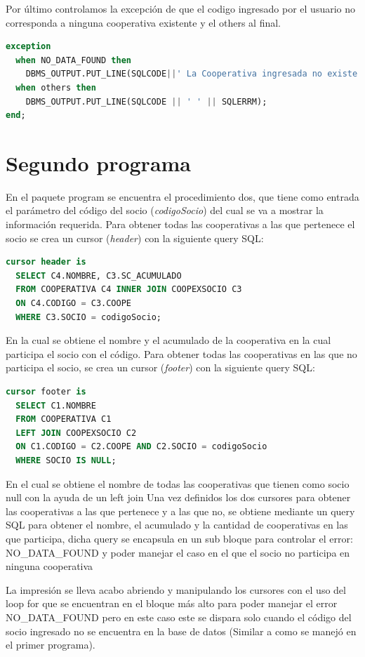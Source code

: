 \documentclass{article}
\begin{document}
Por último controlamos la excepción de que el codigo ingresado por el usuario no corresponda a ninguna cooperativa existente y el others al final.

\begin{lstlisting}[language=SQL,label={lst:lstlisting13}]
exception
  when NO_DATA_FOUND then
    DBMS_OUTPUT.PUT_LINE(SQLCODE||' La Cooperativa ingresada no existe');
  when others then
    DBMS_OUTPUT.PUT_LINE(SQLCODE || ' ' || SQLERRM);
end;
\end{lstlisting}

\section{Segundo programa}
En el paquete program se encuentra el procedimiento dos, que tiene como entrada el parámetro del código del socio (\emph{codigoSocio}) del cual se va a mostrar la información requerida.
Para obtener todas las cooperativas a las que pertenece el socio se crea un cursor (\emph{header}) con la siguiente query SQL: 

\begin{lstlisting}[language=SQL,label={lst:lstlisting14}]
cursor header is
  SELECT C4.NOMBRE, C3.SC_ACUMULADO
  FROM COOPERATIVA C4 INNER JOIN COOPEXSOCIO C3 
  ON C4.CODIGO = C3.COOPE
  WHERE C3.SOCIO = codigoSocio;
\end{lstlisting}
En la cual se obtiene el nombre y el acumulado de la cooperativa en la cual participa el socio con el código.
Para obtener todas las cooperativas en las que no participa el socio, se crea un cursor (\emph{footer}) con la siguiente query SQL: 
\begin{lstlisting}[language=SQL,label={lst:lstlisting15}]
cursor footer is
  SELECT C1.NOMBRE
  FROM COOPERATIVA C1
  LEFT JOIN COOPEXSOCIO C2
  ON C1.CODIGO = C2.COOPE AND C2.SOCIO = codigoSocio
  WHERE SOCIO IS NULL;
\end{lstlisting}
En el cual se obtiene el nombre de todas las cooperativas que tienen como socio null con la ayuda de un left join
Una vez definidos los dos cursores para obtener las cooperativas a las que pertenece y a las que no, se obtiene mediante un query SQL para obtener el nombre, el acumulado y la cantidad de cooperativas en las que participa, dicha query se encapsula en un sub bloque para controlar el error: NO\_DATA\_FOUND y poder manejar el caso en el que el socio no participa en ninguna cooperativa

La impresión se lleva acabo abriendo y manipulando los cursores con el uso del loop for que se encuentran en el bloque más alto para poder manejar el error NO\_DATA\_FOUND pero en este caso este se dispara solo cuando el código del socio ingresado no se encuentra en la base de datos (Similar a como se manejó en el primer programa).
\end{document}
